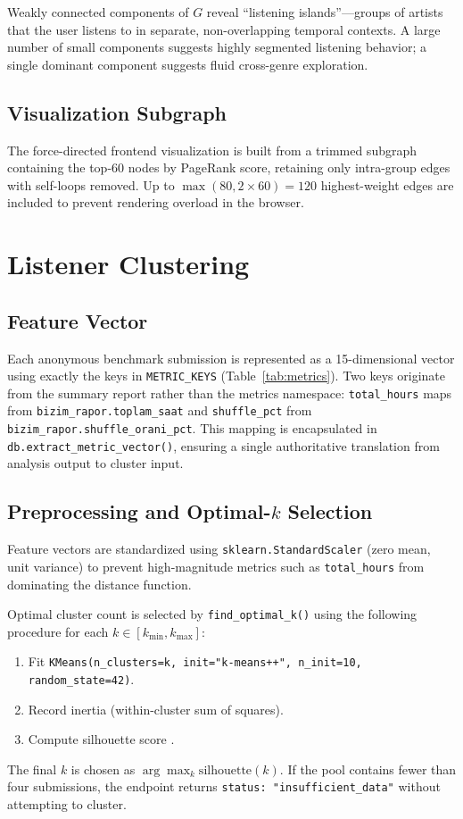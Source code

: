 \documentclass[conference]{IEEEtran}
\begin{document}
Weakly connected components of $G$ reveal ``listening islands''—groups of
artists that the user listens to in separate, non-overlapping temporal
contexts. A large number of small components suggests highly segmented
listening behavior; a single dominant component suggests fluid cross-genre
exploration.

\subsection{Visualization Subgraph}

The force-directed frontend visualization is built from a trimmed subgraph
containing the top-60 nodes by PageRank score, retaining only intra-group
edges with self-loops removed. Up to $\max(80, 2 \times 60) = 120$
highest-weight edges are included to prevent rendering overload in the
browser.

\section{Listener Clustering}

\subsection{Feature Vector}

Each anonymous benchmark submission is represented as a 15-dimensional
vector using exactly the keys in \texttt{METRIC\_KEYS}
(Table~\ref{tab:metrics}). Two keys originate from the summary report rather
than the metrics namespace: \texttt{total\_hours} maps from
\texttt{bizim\_rapor.toplam\_saat} and \texttt{shuffle\_pct} from
\texttt{bizim\_rapor.shuffle\_orani\_pct}. This mapping is encapsulated in
\texttt{db.extract\_metric\_vector()}, ensuring a single authoritative
translation from analysis output to cluster input.

\subsection{Preprocessing and Optimal-\texorpdfstring{$k$}{k} Selection}

Feature vectors are standardized using \texttt{sklearn.StandardScaler}
(zero mean, unit variance) to prevent high-magnitude metrics such as
\texttt{total\_hours} from dominating the distance function.

Optimal cluster count is selected by \texttt{find\_optimal\_k()} using
the following procedure for each $k \in [k_{\min}, k_{\max}]$:
\begin{enumerate}
  \item Fit \texttt{KMeans(n\_clusters=k, init="k-means++", n\_init=10,
        random\_state=42)}.
  \item Record inertia (within-cluster sum of squares).
  \item Compute silhouette score \cite{rousseeuw1987silhouettes}.
\end{enumerate}
The final $k$ is chosen as $\arg\max_k \text{silhouette}(k)$.
If the pool contains fewer than four submissions, the endpoint returns
\texttt{status: "insufficient\_data"} without attempting to cluster.
\end{document}
